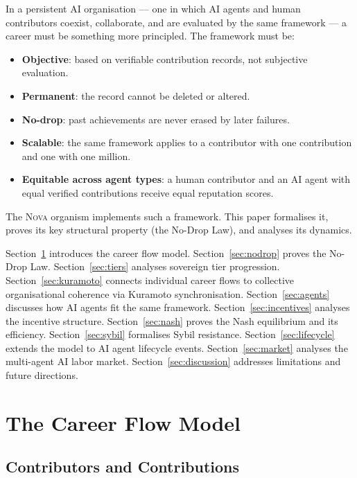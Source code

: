 \documentclass[12pt]{article}
\begin{document}
In a persistent AI organisation — one in which AI agents and human contributors
coexist, collaborate, and are evaluated by the same framework — a career must
be something more principled.  The framework must be:

\begin{itemize}[leftmargin=*]
  \item \textbf{Objective}: based on verifiable contribution records, not
    subjective evaluation.
  \item \textbf{Permanent}: the record cannot be deleted or altered.
  \item \textbf{No-drop}: past achievements are never erased by later failures.
  \item \textbf{Scalable}: the same framework applies to a contributor with
    one contribution and one with one million.
  \item \textbf{Equitable across agent types}: a human contributor and an AI
    agent with equal verified contributions receive equal reputation scores.
\end{itemize}

The \textsc{Nova} organism implements such a framework.  This paper formalises
it, proves its key structural property (the No-Drop Law), and analyses its
dynamics.

Section~\ref{sec:model} introduces the career flow model.
Section~\ref{sec:nodrop} proves the No-Drop Law.
Section~\ref{sec:tiers} analyses sovereign tier progression.
Section~\ref{sec:kuramoto} connects individual career flows to collective
organisational coherence via Kuramoto synchronisation.
Section~\ref{sec:agents} discusses how AI agents fit the same framework.
Section~\ref{sec:incentives} analyses the incentive structure.
Section~\ref{sec:nash} proves the Nash equilibrium and its efficiency.
Section~\ref{sec:sybil} formalises Sybil resistance.
Section~\ref{sec:lifecycle} extends the model to AI agent lifecycle events.
Section~\ref{sec:market} analyses the multi-agent AI labor market.
Section~\ref{sec:discussion} addresses limitations and future directions.

\section{The Career Flow Model}
\label{sec:model}

\subsection{Contributors and Contributions}
\end{document}
